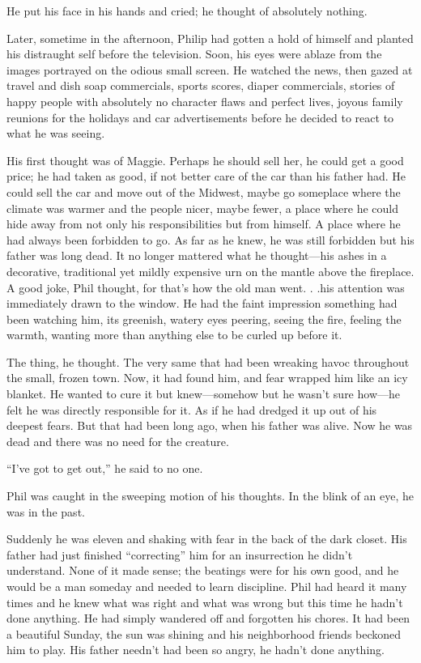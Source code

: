 He put his face in his hands and cried; he thought of absolutely
nothing.

Later, sometime in the afternoon, Philip had gotten a hold of himself
and planted his distraught self before the television. Soon, his eyes
were ablaze from the images portrayed on the odious small screen. He
watched the news, then gazed at travel and dish soap commercials, sports
scores, diaper commercials, stories of happy people with absolutely no
character flaws and perfect lives, joyous family reunions for the
holidays and car advertisements before he decided to react to what he
was seeing.

His first thought was of Maggie. Perhaps he should sell her, he could
get a good price; he had taken as good, if not better care of the car
than his father had. He could sell the car and move out of the Midwest,
maybe go someplace where the climate was warmer and the people nicer,
maybe fewer, a place where he could hide away from not only his
responsibilities but from himself. A place where he had always been
forbidden to go. As far as he knew, he was still forbidden but his
father was long dead. It no longer mattered what he thought---his ashes
in a decorative, traditional yet mildly expensive urn on the mantle
above the fireplace. A good joke, Phil thought, for that's how the old
man went. . .his attention was immediately drawn to the window. He had
the faint impression something had been watching him, its greenish,
watery eyes peering, seeing the fire, feeling the warmth, wanting more
than anything else to be curled up before it.

The thing, he thought. The very same that had been wreaking havoc
throughout the small, frozen town. Now, it had found him, and fear
wrapped him like an icy blanket. He wanted to cure it but knew---somehow
but he wasn't sure how---he felt he was directly responsible for it. As
if he had dredged it up out of his deepest fears. But that had been long
ago, when his father was alive. Now he was dead and there was no need
for the creature.

``I've got to get out,'' he said to no one.

Phil was caught in the sweeping motion of his thoughts. In the blink of
an eye, he was in the past.

Suddenly he was eleven and shaking with fear in the back of the dark
closet. His father had just finished ``correcting'' him for an
insurrection he didn't understand. None of it made sense; the beatings
were for his own good, and he would be a man someday and needed to learn
discipline. Phil had heard it many times and he knew what was right and
what was wrong but this time he hadn't done anything. He had simply
wandered off and forgotten his chores. It had been a beautiful Sunday,
the sun was shining and his neighborhood friends beckoned him to play.
His father needn't had been so angry, he hadn't done anything.

